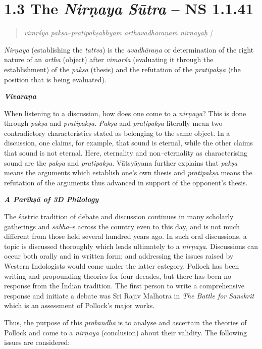 \section*{1.3 The {\it {\bfseries Nirṇaya Sūtra}} – NS 1.1.41}

\begin{verse}
\textit{vimṛśya pakṣa–pratipakṣābhyām arthāvadhāraṇaṁ nirṇayaḥ |}
\end{verse}

\textit{Nirṇaya} (establishing the \textit{tattva}) is the \textit{avadhāraṇa} or determination of the right nature of an \textit{artha} (object) after \textit{vimarśa} (evaluating it through the establishment) of the \textit{pakṣa} (thesis) and the refutation of the \textit{pratipakṣa} (the position that is being evaluated).

\textit{\textbf{Vivaraṇa}}

When listening to a discussion, how does one come to a \textit{nirṇaya}? This is done through \textit{pakṣa} and \textit{pratipakṣa}. \textit{Pakṣa} and \textit{pratipakṣa} literally mean two contradictory characteristics stated as belonging to the same object. In a discussion, one claims, for example, that sound is eternal, while the other claims that sound is not eternal. Here, eternality and non–eternality as characterising sound are the \textit{pakṣa} and \textit{pratipakṣa}. Vātsyāyana further explains that \textit{pakṣa} means the arguments which establish one's own thesis and \textit{pratipakṣa }means the refutation of the arguments thus advanced in support of the opponent's thesis.

\textbf{\textit{A Parīkṣā of 3D Philology}}

The śāstric tradition of debate and discussion continues in many scholarly gatherings and \textit{sabhā}–s across the country even to this day, and is not much different from those held several hundred years ago. In such oral discussions, a topic is discussed thoroughly which leads ultimately to a \textit{nirṇaya}. Discussions can occur both orally and in written form; and addressing the issues raised by Western Indologists would come under the latter category. Pollock has been writing and propounding theories for four decades, but there has been no response from the Indian tradition. The first person to write a comprehensive response and initiate a debate was Sri Rajiv Malhotra in \textit{The Battle for Sanskrit }which is an assessment of Pollock’s major works.

Thus, the purpose of this \textit{prabandha} is to analyse and ascertain the theories of Pollock and come to a \textit{nirṇaya} (conclusion) about their validity. The following issues are considered:

